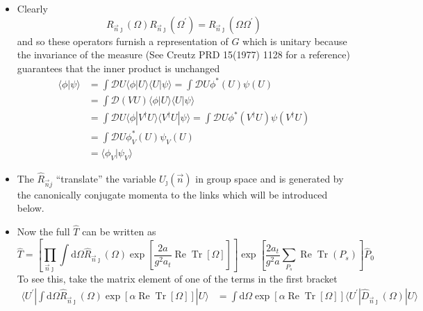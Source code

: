 \begin{itemize}
  
  \begin{itemize}
      \item Clearly
      \begin{equation}
       R_{\vec{n} \jmath}(\Omega) R_{\vec{n} \jmath}\left(\Omega^{\prime}\right)=R_{\vec{n} \jmath}\left(\Omega \Omega^{\prime}\right)
       \end{equation}
       and so these operators furnish a representation of $G$ which is unitary because  the invariance of the measure (See Creutz PRD 15(1977) 1128 for a reference) guarantees that the inner product is unchanged
       \begin{align*}
           \langle \phi | \psi \rangle &= \int \mathcal{D}U\langle \phi | U \rangle \langle U |\psi \rangle = \int \mathcal{D}U \phi^*(U) \psi(U)\\
           &= \int \mathcal{D}(VU)\langle \phi | U \rangle \langle U | \psi \rangle \\
           &= \int \mathcal{D} U \langle \phi | V^\dagger U \rangle \langle V^\dagger U | \psi \rangle = \int \mathcal{D}U \phi^*(V^\dagger U)\psi(V^\dagger U) \\
           &= \int \mathcal{D} U \phi_V^*(U) \psi_V(U) \\
           &= \langle \phi_V | \psi_V \rangle
       \end{align*}
       \item The $\hat{R}_{\vec{n}j}$ ``translate'' the variable $U_\jmath(\vec{n})$ in group space and is generated by the canonically conjugate momenta to the links which will be introduced below.
       \item Now the full $\hat{T}$ can be written as
       \begin{equation}
           \hat{T} = \left[ \prod_{\vec{n} \jmath} \int \text{d}\Omega \hat{R}_{\vec{n}\jmath}(\Omega) \exp \left[\frac{2a}{g^2 a_t}\operatorname{Re}\operatorname{Tr}[\Omega] \right]\right] \exp \left[\frac{2 a_t}{g^2 a}\sum_{P_s}\operatorname{Re}\operatorname{Tr}(P_s) \right]\hat{P}_0
       \end{equation}
       To see this, take the matrix element of one of the terms in the first bracket
       \begin{align*}
           \langle U^\prime|\int\text{d}\Omega \hat{R}_{\vec{n}\jmath}(\Omega) \exp[\alpha \operatorname{Re}\operatorname{Tr}[\Omega]] |U\rangle
           &= \int \text{d}\Omega \exp[\alpha \operatorname{Re}\operatorname{Tr}[\Omega]]\langle U^\prime | \hat{D}_{\vec{n} \jmath}(\Omega)|U\rangle \\

\end{align*}
\end{itemize}
\end{itemize}
